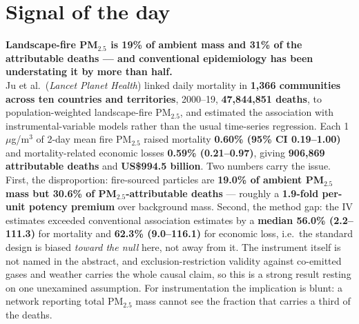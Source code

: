 \documentclass[10pt]{article}
\begin{document}
\vspace{6mm}

\section*{\sffamily\bfseries\color{Deep}Signal of the day}
\vspace{-1.5mm}{\color{Amber}\rule{\linewidth}{1.1pt}}\vspace{2.5mm}

\begin{keybox}
{\sffamily\bfseries\small\color{Deep}Landscape-fire PM$_{2.5}$ is 19\% of ambient mass
and 31\% of the attributable deaths --- and conventional epidemiology has been
understating it by more than half.}\\[1.4mm]
\footnotesize
Ju et al.\ (\textit{Lancet Planet Health}) linked daily mortality in \textbf{1{,}366
communities across ten countries and territories}, 2000--19, \textbf{47{,}844{,}851
deaths}, to population-weighted landscape-fire PM$_{2.5}$, and estimated the association
with instrumental-variable models rather than the usual time-series regression. Each
1\,$\mu$g/m$^3$ of 2-day mean fire PM$_{2.5}$ raised mortality
\textbf{0.60\% (95\% CI 0.19--1.00)} and mortality-related economic losses
\textbf{0.59\% (0.21--0.97)}, giving \textbf{906{,}869 attributable deaths} and
\textbf{US\$994.5 billion}. Two numbers carry the issue. First, the disproportion:
fire-sourced particles are \textbf{19.0\% of ambient PM$_{2.5}$ mass but 30.6\% of
PM$_{2.5}$-attributable deaths} --- roughly a \textbf{1.9-fold per-unit potency premium}
over background mass. Second, the method gap: the IV estimates exceeded conventional
association estimates by a \textbf{median 56.0\% (2.2--111.3)} for mortality and
\textbf{62.3\% (9.0--116.1)} for economic loss, i.e.\ the standard design is biased
\emph{toward the null} here, not away from it. The instrument itself is not named in the
abstract, and exclusion-restriction validity against co-emitted gases and weather carries
the whole causal claim, so this is a strong result resting on one unexamined assumption.
For instrumentation the implication is blunt: a network reporting total PM$_{2.5}$
mass cannot see the fraction that carries a third of the deaths.
\end{keybox}

\clearpage

\end{document}
